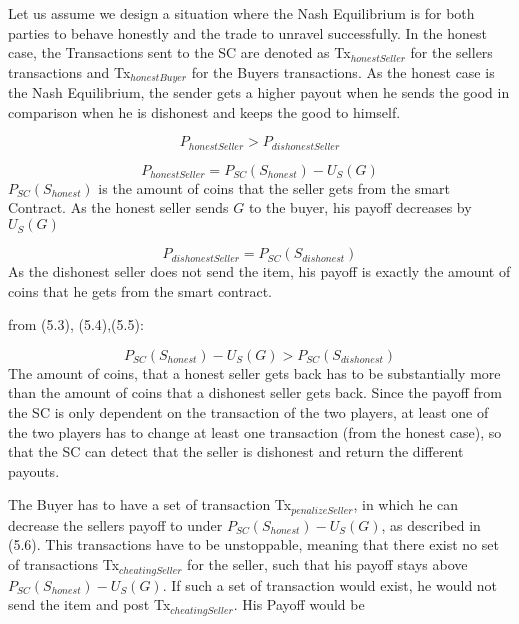 \documentclass{cacthesis}
\begin{document}
Let us assume we design a situation where the Nash Equilibrium is for both parties to behave honestly and the trade to unravel successfully. In the honest case, the Transactions sent to the SC are denoted as Tx$_{honestSeller}$ for the sellers transactions and Tx$_{honestBuyer}$ for the Buyers transactions. \newline
As the honest case is the Nash Equilibrium, the sender gets a higher payout when he sends the good in comparison when he is dishonest and keeps the good to himself.

\begin{equation}
    P_{honestSeller} > P_{dishonestSeller}
\end{equation}

\begin{equation}
    P_{honestSeller} = P_{SC}(S_{honest})- U_S(G)
\end{equation}
$P_{SC}(S_{honest})$ is the amount of coins that the seller gets from the smart Contract. As the honest seller sends $G$ to the buyer, his payoff decreases by $U_S(G)$

\begin{equation}
    P_{dishonestSeller} = P_{SC}(S_{dishonest})
\end{equation}
As the dishonest seller does not send the item, his payoff is exactly the amount of coins that he gets from the smart contract.

from (5.3), (5.4),(5.5):

\begin{equation}
   P_{SC}(S_{honest})- U_S(G) > P_{SC}(S_{dishonest})
\end{equation}
The amount of coins, that a honest seller gets back has to be substantially more than the amount of coins that a dishonest seller gets back.\newline
Since the payoff from the SC is only dependent on the transaction of the two players, at least one of the two players has to change at least one transaction (from the honest case), so that the SC can detect that the seller is dishonest and return the different payouts.\newline

The Buyer has to have a set of transaction Tx$_{penalizeSeller}$, in which he can decrease the sellers payoff to under $P_{SC}(S_{honest})- U_S(G)$, as described in (5.6).\newline
This transactions have to be unstoppable, meaning that there exist no set of transactions Tx$_{cheatingSeller}$ for the seller, such that his payoff stays above $P_{SC}(S_{honest})- U_S(G)$. \newline 
If such a set of transaction would exist, he would not send the item and post Tx$_{cheatingSeller}$. His Payoff would be 
\end{document}
